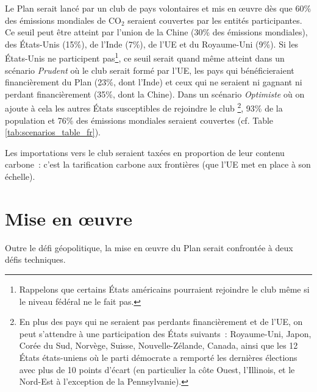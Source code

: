 \documentclass[a5paper,french]{memoir}
\begin{document}
Le Plan serait lancé par un club de pays volontaires et mis en œuvre dès que 60\% des émissions mondiales de CO$_\text{2}$ seraient couvertes par les entités participantes. Ce seuil peut être atteint par l'union de la Chine (30\% des émissions mondiales), des États-Unis (15\%), de l'Inde (7\%), de l'UE et du Royaume-Uni (9\%). Si les États-Unis ne participent pas\footnote{Rappelons que certains États américains pourraient rejoindre le club même si le niveau fédéral ne le fait pas.}, ce seuil serait quand même atteint dans un scénario \textit{Prudent} où le club serait formé par l'UE, les pays qui bénéficieraient financièrement du Plan (23\%, dont l'Inde) et ceux qui ne seraient ni gagnant ni perdant financièrement (35\%, dont la Chine). %
Dans un scénario \textit{Optimiste} où on ajoute à cela les autres États susceptibles de rejoindre le club
\footnote{En plus des pays qui ne seraient pas perdants financièrement et de l'UE, on peut s'attendre à une participation des États suivants~: Royaume-Uni, Japon, Corée du Sud, Norvège, Suisse, Nouvelle-Zélande, Canada, ainsi que les 12 États états-uniens où le parti démocrate a remporté les dernières élections avec plus de 10 points d'écart (en particulier la côte Ouest, l'Illinois, et le Nord-Est à l'exception de la Pennsylvanie).}, 
93\% de la population et 76\% des émissions mondiales seraient couvertes (cf. Table \ref{tab:scenarios_table_fr}). 


Les importations vers le club seraient taxées en proportion de leur contenu carbone~: c'est la tarification carbone aux frontières (que l'UE met en place à son échelle). 


\section{Mise en œuvre}\label{sec:implementation}
Outre le défi géopolitique, la mise en œuvre du Plan serait confrontée à deux défis techniques. 
\end{document}
